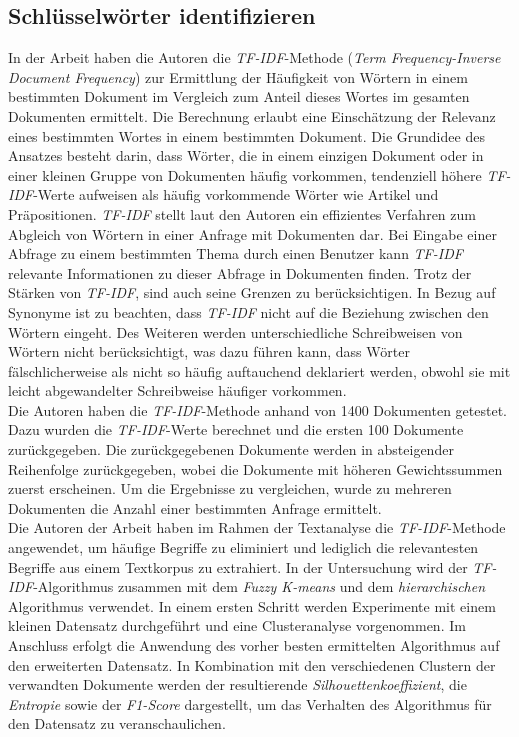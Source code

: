 \subsection*{Schlüsselwörter identifizieren}
In der Arbeit \cite{ramos2003using} haben die Autoren \citeauthor{ramos2003using} die \emph{TF-IDF}-Methode (\emph{Term Frequency-Inverse Document Frequency}) zur Ermittlung der Häufigkeit von Wörtern in einem bestimmten Dokument im Vergleich zum Anteil dieses Wortes im gesamten Dokumenten ermittelt. Die Berechnung erlaubt eine Einschätzung der Relevanz eines bestimmten Wortes in einem bestimmten Dokument. Die Grundidee des Ansatzes besteht darin, dass Wörter, die in einem einzigen Dokument oder in einer kleinen Gruppe von Dokumenten häufig vorkommen, tendenziell höhere \emph{TF-IDF}-Werte aufweisen als häufig vorkommende Wörter wie Artikel und Präpositionen. \emph{TF-IDF} stellt laut den Autoren ein effizientes Verfahren zum Abgleich von Wörtern in einer Anfrage mit Dokumenten dar. Bei Eingabe einer Abfrage zu einem bestimmten Thema durch einen Benutzer kann \emph{TF-IDF} relevante Informationen zu dieser Abfrage in Dokumenten finden. Trotz der Stärken von \emph{TF-IDF}, sind auch seine Grenzen zu berücksichtigen. In Bezug auf Synonyme ist zu beachten, dass \emph{TF-IDF} nicht auf die Beziehung zwischen den Wörtern eingeht. Des Weiteren werden unterschiedliche Schreibweisen von Wörtern nicht berücksichtigt, was dazu führen kann, dass Wörter fälschlicherweise als nicht so häufig auftauchend deklariert werden, obwohl sie mit leicht abgewandelter Schreibweise häufiger vorkommen.\\
Die Autoren haben die \emph{TF-IDF}-Methode anhand von 1400 Dokumenten getestet. Dazu wurden die \emph{TF-IDF}-Werte berechnet und die ersten 100 Dokumente zurückgegeben. Die zurückgegebenen Dokumente werden in absteigender Reihenfolge zurückgegeben, wobei die Dokumente mit höheren Gewichtssummen zuerst erscheinen. Um die Ergebnisse zu vergleichen, wurde zu mehreren Dokumenten die Anzahl einer bestimmten Anfrage ermittelt.\\

Die Autoren \citeauthor{bafna2016document} der Arbeit \cite{bafna2016document} haben im Rahmen der Textanalyse die \emph{TF-IDF}-Methode angewendet, um häufige Begriffe zu eliminiert und lediglich die relevantesten Begriffe aus einem Textkorpus zu extrahiert. In der Untersuchung wird der \emph{TF-IDF}-Algorithmus zusammen mit dem \emph{Fuzzy K-means} und dem \emph{hierarchischen} Algorithmus verwendet. In einem ersten Schritt werden Experimente mit einem kleinen Datensatz durchgeführt und eine Clusteranalyse vorgenommen. Im Anschluss erfolgt die Anwendung des vorher besten ermittelten Algorithmus auf den erweiterten Datensatz. In Kombination mit den verschiedenen Clustern der verwandten Dokumente werden der resultierende \emph{Silhouettenkoeffizient}, die \emph{Entropie} sowie der \emph{F1-Score} dargestellt, um das Verhalten des Algorithmus für den Datensatz zu veranschaulichen.\\
